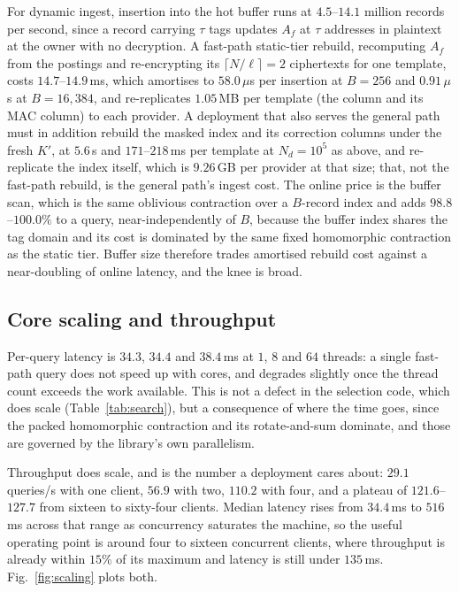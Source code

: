 \documentclass[a4paper,fleqn]{cas-dc}
\begin{document}
For dynamic ingest, insertion into the hot buffer runs at $4.5$--$14.1$
million records per second, since a record carrying $\tau$ tags updates $A_f$
at $\tau$ addresses in plaintext at the owner with no decryption. A fast-path
static-tier rebuild, recomputing $A_f$ from the postings and re-encrypting its
$\lceil N/\ell\rceil=2$ ciphertexts for one template, costs
$14.7$--$14.9$\,ms, which amortises to $58.0\,\mu$s per insertion at $B=256$
and $0.91\,\mu$s at $B=16{,}384$, and re-replicates $1.05$\,MB per template
(the column and its MAC column) to each provider. A deployment that also
serves the general path must in addition rebuild the masked index and its
correction columns under the fresh $K'$, at $5.6$\,s and $171$--$218$\,ms per
template at $N_d=10^5$ as above, and re-replicate the index itself, which is
$9.26$\,GB per provider at that size; that, not the fast-path rebuild, is the
general path's ingest cost. The online price is the buffer scan, which is the
same oblivious contraction over a $B$-record index and adds
$98.8$--$100.0\%$ to a query, near-independently of $B$, because the buffer
index shares the tag domain and its cost is dominated by the same fixed
homomorphic contraction as the static tier. Buffer size therefore trades
amortised rebuild cost against a near-doubling of online latency, and the knee
is broad.

\subsection{Core scaling and throughput}
\label{sec:scaling}
Per-query latency is $34.3$, $34.4$ and $38.4$\,ms at $1$, $8$ and $64$
threads: a single fast-path query does not speed up with cores, and degrades
slightly once the thread count exceeds the work available. This is not a
defect in the selection code, which does scale (Table~\ref{tab:search}), but a
consequence of where the time goes, since the packed homomorphic contraction
and its rotate-and-sum dominate, and those are governed by the library's own
parallelism.

Throughput does scale, and is the number a deployment cares about: $29.1$
queries/s with one client, $56.9$ with two, $110.2$ with four, and a plateau
of $121.6$--$127.7$ from sixteen to sixty-four clients. Median latency rises
from $34.4$\,ms to $516$\,ms across that range as concurrency saturates the
machine, so the useful operating point is around four to sixteen concurrent
clients, where throughput is already within $15\%$ of its maximum and latency
is still under $135$\,ms. Fig.~\ref{fig:scaling} plots both.
\end{document}
